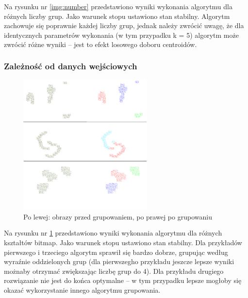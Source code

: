 Na rysunku nr \ref{img:number} przedstawiono wyniki wykonania algorytmu dla różnych liczby grup. Jako warunek stopu ustawiono stan stabilny. Algorytm zachowuje się poprawnie każdej liczby grup, jednak należy zwrócić uwagę, że dla identycznych parametrów wykonania (w tym przypadku k = 5) algorytm może zwrócić różne wyniki -- jest to efekt losowego doboru centroidów.

\subsubsection{Zależność od danych wejściowych}

\begin{figure}[!h]
	\centering
	\includegraphics[width=0.6\textwidth]{./img/shape.png}
	\caption{Po lewej: obrazy przed grupowaniem, po prawej po grupowaniu}
	\label{img:shape}
\end{figure}

Na rysunku nr \ref{img:shape} przedstawiono wyniki wykonania algorytmu dla różnych kształtów bitmap. Jako warunek stopu ustawiono stan stabilny. Dla przykładów pierwszego i trzeciego algorytm sprawił się bardzo dobrze, grupując według wyraźnie oddzielonych grup (dla pierwszegho przykładu jeszcze lepsze wyniki możnaby otrzymać zwiększając liczbę grup do 4). Dla przykładu drugiego rozwiązanie nie jest do końca optymalne -- w tym przypadku lepsze mogłoby się okazać wykorzystanie innego algorytmu grupowania.